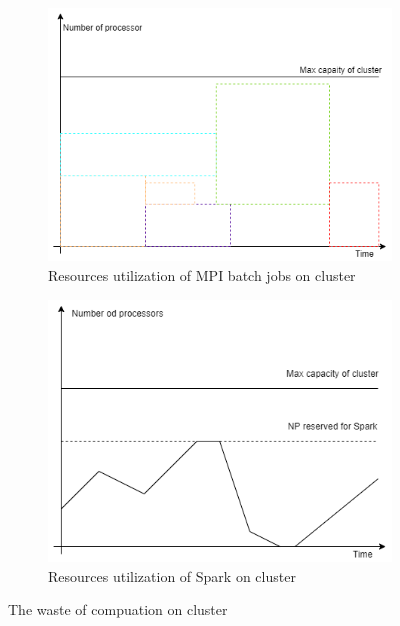 \documentclass[sigchi]{acmart}
\begin{document}
\begin{figure}[h!]
  \begin{subfigure}[b]{0.45\textwidth}
      \includegraphics[width=\textwidth]{img/MPI_batch.png}
      \caption{Resources utilization of MPI batch jobs on cluster}
      \label{fig:MPI_batch}
  \end{subfigure}
  \begin{subfigure}[b]{0.45\textwidth}
      \includegraphics[width=\textwidth]{img/spark_NP.png}
      \caption{Resources utilization of Spark on cluster}
      \label{fig:spark_np}
  \end{subfigure}
  \caption{The waste of compuation on cluster}\label{fig:waste_cluster}
\end{figure}
\end{document}
